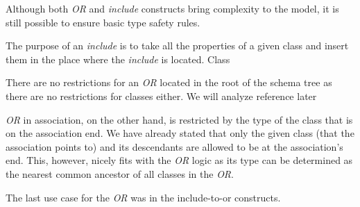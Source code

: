 Although both \textit{OR} and \textit{include} constructs bring complexity to the model, it is still possible to ensure basic type safety rules.

The purpose of an \textit{include} is to take all the properties of a given class and insert them in the place where the \textit{include} is located. Class


There are no restrictions for an \textit{OR} located in the root of the schema tree as there are no restrictions for classes either. We will analyze reference later

\textit{OR} in association, on the other hand, is restricted by the type of the class that is on the association end. We have already stated that only the given class (that the association points to) and its descendants are allowed to be at the association's end. This, however, nicely fits with the \textit{OR} logic as its type can be determined as the nearest common ancestor of all classes in the \textit{OR}.

The last use case for the \textit{OR} was in the include-to-or constructs.




